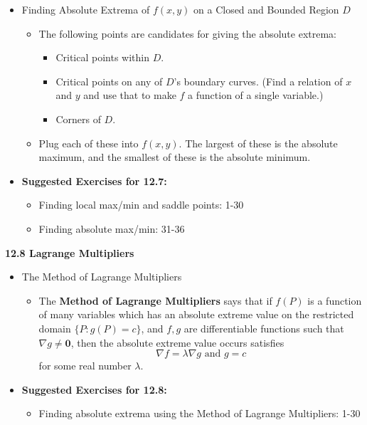 \documentclass[12pt]{article}
\renewcommand{\vec}[1]{\mathbf{#1}}
\newcommand{\<}{\left<}
\renewcommand{\>}{\right>}
\begin{document}
\begin{itemize}
  \item Finding Absolute Extrema of $f(x,y)$ on a Closed and Bounded Region $D$
    \begin{itemize}
      \item The following points are candidates for giving the absolute extrema:
        \begin{itemize}
          \item Critical points within $D$.
          \item Critical points on any of $D$'s boundary curves. (Find a relation of $x$ and $y$ and use that to make $f$ a function of a single variable.)
          \item Corners of $D$.
        \end{itemize}
      \item Plug each of these into $f(x,y)$. The largest of these is the absolute maximum, and the smallest of these is the absolute minimum.
    \end{itemize}
    
  \item \textbf{Suggested Exercises for 12.7:}
  
    \begin{itemize}
    \item Finding local max/min and saddle points: 1-30
    \item Finding absolute max/min: 31-36
    \end{itemize}
  
\end{itemize}
  
  \newpage
  
  \centerline{\bf 12.8 Lagrange Multipliers}
  
  \begin{itemize}
  
  \item The Method of Lagrange Multipliers
  
    \begin{itemize}
    \item The \textbf{Method of Lagrange Multipliers} says that if $f(P)$ is a function of many variables which has an absolute extreme value on the restricted domain $\{P : g(P)=c\}$, and $f,g$ are differentiable functions such that $\nabla g \not= \vec{0}$, then the absolute extreme value occurs satisfies \[\nabla f=\lambda \nabla g \text{ and } g=c\] for some real number $\lambda$.
    \end{itemize}
    
  \item \textbf{Suggested Exercises for 12.8:}
  
    \begin{itemize}
    \item Finding absolute extrema using the Method of Lagrange Multipliers: 1-30
    \end{itemize}
    
  \end{itemize}
  
\end{document}
